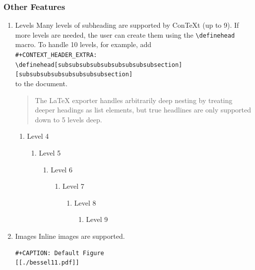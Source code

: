\documentclass[11pt]{article}
\begin{document}
\subsubsection{Other Features}
\label{sec:org594022a}
\begin{enumerate}
\item Levels
\label{sec:org347b698}
Many levels of subheading are supported by ConTeXt (up to 9). If more levels
are needed, the user can create them using the \texttt{\textbackslash{}definehead} macro. To handle
10 levels, for example, add \\
\texttt{\#+CONTEXT\_HEADER\_EXTRA: \textbackslash{}definehead[subsubsubsubsubsubsubsubsubsection]
    [subsubsubsubsubsubsubsubsection]} \\
to the document.
\begin{quote}
The \LaTeX{} exporter handles arbitrarily deep nesting by treating deeper
headings as list elements, but true headlines are only supported down
to 5 levels deep.
\end{quote}
\begin{enumerate}
\item Level 4
\label{sec:orgb8f5136}
\begin{enumerate}
\item Level 5
\label{sec:org1d8a34e}
\begin{enumerate}
\item Level 6
\label{sec:orgf1e3481}
\begin{enumerate}
\item Level 7
\label{sec:org289de1e}
\begin{enumerate}
\item Level 8
\label{sec:org9606cb1}
\begin{enumerate}
\item Level 9
\label{sec:org5c5163f}
\end{enumerate}
\end{enumerate}
\end{enumerate}
\end{enumerate}
\end{enumerate}
\end{enumerate}
\item Images
\label{sec:orgab4ff1d}
Inline images are supported.

\begin{verbatim}
#+CAPTION: Default Figure
[[./bessel11.pdf]]
\end{verbatim}


\end{enumerate}
\end{document}
